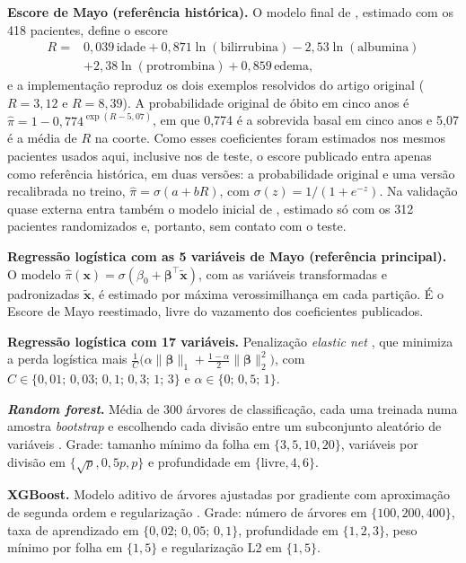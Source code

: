 \textbf{Escore de Mayo (referência histórica).} O modelo final de , estimado com os 418 pacientes, define o escore
\begin{equation}
\begin{aligned}
R ={}& 0{,}039\,\text{idade} + 0{,}871\ln(\text{bilirrubina}) - 2{,}53\ln(\text{albumina})\\
&+ 2{,}38\ln(\text{protrombina}) + 0{,}859\,\text{edema},
\end{aligned}
\label{eq:mayo}
\end{equation}
e a implementação reproduz os dois exemplos resolvidos do artigo original ($R = 3{,}12$ e $R = 8{,}39$). A probabilidade original de óbito em cinco anos é $\hat{\pi} = 1 - 0{,}774^{\exp(R - 5{,}07)}$, em que 0,774 é a sobrevida basal em cinco anos e 5,07 é a média de $R$ na coorte. Como esses coeficientes foram estimados nos mesmos pacientes usados aqui, inclusive nos de teste, o escore publicado entra apenas como referência histórica, em duas versões: a probabilidade original e uma versão recalibrada no treino, $\hat{\pi} = \sigma(a + bR)$, com $\sigma(z) = 1/(1+e^{-z})$. Na validação quase externa entra também o modelo inicial de , estimado só com os 312 pacientes randomizados e, portanto, sem contato com o teste.

\textbf{Regressão logística com as 5 variáveis de Mayo (referência principal).} O modelo $\hat{\pi}(\mathbf{x}) = \sigma(\beta_0 + \boldsymbol{\beta}^\top \tilde{\mathbf{x}})$, com as variáveis transformadas e padronizadas $\tilde{\mathbf{x}}$, é estimado por máxima verossimilhança em cada partição. É o Escore de Mayo reestimado, livre do vazamento dos coeficientes publicados.

\textbf{Regressão logística com 17 variáveis.} Penalização \textit{elastic net} \cite{zou2005elasticnet}, que minimiza a perda logística mais $\frac{1}{C}\big(\alpha\|\boldsymbol{\beta}\|_1 + \frac{1-\alpha}{2}\|\boldsymbol{\beta}\|_2^2\big)$, com $C \in \{0{,}01;\,0{,}03;\,0{,}1;\,0{,}3;\,1;\,3\}$ e $\alpha \in \{0;\,0{,}5;\,1\}$.

\textbf{\textit{Random forest}.} Média de 300 árvores de classificação, cada uma treinada numa amostra \textit{bootstrap} e escolhendo cada divisão entre um subconjunto aleatório de variáveis \cite{breiman2001random}. Grade: tamanho mínimo da folha em $\{3, 5, 10, 20\}$, variáveis por divisão em $\{\sqrt{p}, 0{,}5p, p\}$ e profundidade em $\{$livre$, 4, 6\}$.

\textbf{XGBoost.} Modelo aditivo de árvores ajustadas por gradiente com aproximação de segunda ordem e regularização \cite{chen2016xgboost}. Grade: número de árvores em $\{100, 200, 400\}$, taxa de aprendizado em $\{0{,}02;\,0{,}05;\,0{,}1\}$, profundidade em $\{1, 2, 3\}$, peso mínimo por folha em $\{1, 5\}$ e regularização L2 em $\{1, 5\}$.

